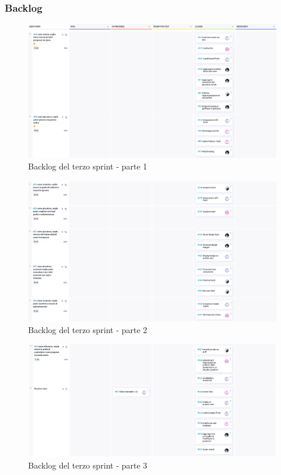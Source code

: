 \documentclass{article}
\begin{document}
\subsubsection{Backlog}
\begin{figure}[H]
    \centering
    \includegraphics[width=1\textwidth]{backlog3_1}
    \caption{Backlog del terzo sprint - parte 1}
    \label{fig:backlog3_1}
\end{figure}

\begin{figure}[H]
    \centering
    \includegraphics[width=1\textwidth]{backlog3_2}
    \caption{Backlog del terzo sprint - parte 2}
    \label{fig:backlog3_2}
\end{figure}

\begin{figure}[H]
    \centering
    \includegraphics[width=1\textwidth]{backlog3_3}
    \caption{Backlog del terzo sprint - parte 3}
    \label{fig:backlog3_3}
\end{figure}
\end{document}
